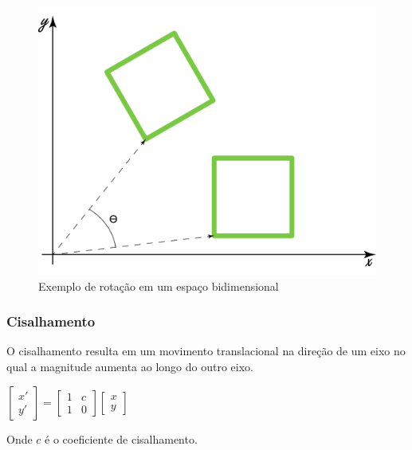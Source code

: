 \documentclass[9pt, a4paper, nofonttune, journal]{IEEEtran}
\begin{document}
\begin{figure}[H] 
\begin{center}
\includegraphics[scale=0.25]{figuras/rotation1}
\caption{Exemplo de rotação em um espaço bidimensional}
\end{center}
\end{figure}

\subsubsection{Cisalhamento}
O cisalhamento resulta em um movimento translacional na direção de um eixo no qual a magnitude aumenta ao longo do outro eixo.

\begin{center}
$\begin{bmatrix}x'\\
y'
\end{bmatrix}=\begin{bmatrix}1 & c\\
1 & 0
\end{bmatrix}\begin{bmatrix}x\\
y
\end{bmatrix}$\end{center}
Onde $c$ é o coeficiente de cisalhamento.\cite{CGPPBook1}
\end{document}
